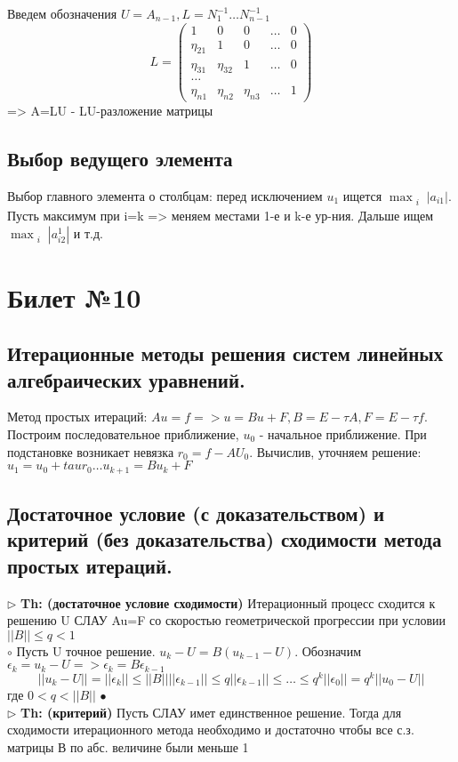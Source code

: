 \documentclass[a4paper]{article}
\begin{document}
Введем обозначения $U=A_{n-1}, L=N_1^{-1}\ldots N_{n-1}^{-1}$
$$ L = \begin{pmatrix}
1 & 0 & 0 & \ldots & 0 \\
\eta_{21} & 1 & 0 & \ldots & 0 \\
\eta_{31} & \eta_{32} & 1 & \ldots & 0 \\
\ldots \\
\eta_{n1} & \eta_{n2} & \eta_{n3} & \ldots & 1
\end{pmatrix} $$
=> A=LU - LU-разложение матрицы

\subsection{Выбор ведущего элемента}
Выбор главного элемента о столбцам: перед исключением $u_1$ ищется $\max_{\substack{i}} |a_{i1}|$. Пусть максимум при i=k => меняем местами 1-е и k-е ур-ния. Дальше ищем $\max_{\substack{i}} |a_{i2}^1|$ и т.д.

\section{Билет №10}
\subsection{Итерационные методы решения систем линейных алгебраических уравнений.}
Метод простых итераций: $Au=f => u=Bu+F, B=E- \tau A, F=E-\tau f$. Построим последовательное приближение, $u_0$ - начальное приближение. При подстановке возникает невязка $r_0=f-AU_0$. Вычислив, уточняем решение: $u_1=u_0+tau r_0 \ldots u_{k+1}=Bu_k+F$

\subsection{Достаточное условие (с доказательством) и критерий (без доказательства) сходимости метода простых итераций.}
$\triangleright$ \textbf{Th: (достаточное условие сходимости)} Итерационный процесс сходится к решению U СЛАУ Au=F со скоростью геометрической прогрессии при условии $||B|| \leq q <1$ \\
	$\circ$ 
	Пусть U точное решение. $ u_k-U=B(u_{k-1}-U)$. Обозначим $\epsilon_k = u_k-U => \epsilon_k=B\epsilon_{k-1}$
	$$ ||u_k-U|| = ||\epsilon_k|| \leq ||B|| ||\epsilon_{k-1}|| \leq q||\epsilon_{k-1}|| \leq \ldots \leq q^k||\epsilon_0||=q^k||u_0-U||$$
	где $0<q<||B||$
	$\bullet$ \\
$\triangleright$ \textbf{Th: (критерий)} Пусть СЛАУ имет единственное решение. Тогда для сходимости итерационного метода необходимо и достаточно чтобы все с.з. матрицы В по абс. величине были меньше 1
\end{document}

